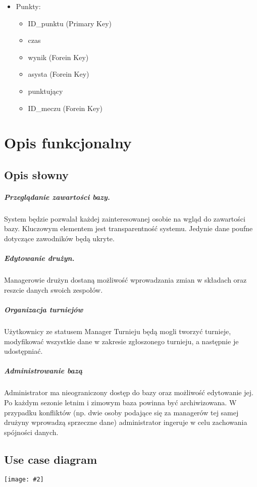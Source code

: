 \documentclass[polish, 11pt]{article}
\newcommand{\obrazek}[3][1.0]{
    \texttt{[image: \#2]}
    \captionof{figure}{#3\label{fig:#2}}
}
\begin{document}
\begin{itemize}
	    	\item	Punkty:
	    		\begin{itemize}
			    	\item ID\_punktu (Primary Key)
			    	\item czas
			    	\item wynik (Forein Key)
			    	\item asysta (Forein Key)
			    	\item punktujący
			    	\item ID\_meczu (Forein Key)
			    \end{itemize}
			    	  
	    \end{itemize}
	    
	\section{Opis funkcjonalny}
	
		\subsection{Opis słowny}
			
				\subparagraph{ Przeglądanie zawartości bazy.\\} 
					System będzie pozwalał każdej zainteresowanej osobie na wgląd do zawartości bazy. Kluczowym elementem jest transparentność systemu. Jedynie dane poufne dotyczące zawodników będą ukryte.
				\subparagraph{Edytowanie drużyn. \\}
					Managerowie drużyn dostaną możliwość wprowadzania zmian w składach oraz reszcie danych swoich zespołów.
				\subparagraph{Organizacja turniejów \\}
					Użytkownicy ze statusem Manager Turnieju będą mogli tworzyć turnieje, modyfikować wszystkie dane w zakresie zgłoszonego turnieju, a następnie je udostępniać.
				\subparagraph{Administrowanie bazą \\}
					Administrator ma nieograniczony dostęp do bazy oraz możliwość edytowanie jej. Po każdym sezonie letnim i zimowym baza powinna być archiwizowana. W przypadku konfliktów (np. dwie osoby podające się za managerów tej samej drużyny wprowadzą sprzeczne dane) administrator ingeruje w celu zachowania spójności danych.
			
		
		
		\subsection{Use case diagram}
			\begin{center}
				\obrazek[0.9]{BD-UseCase2popr.png}{use case diagram}
			\end{center}
		



		    
		    \vspace{0.5cm}
\end{document}
